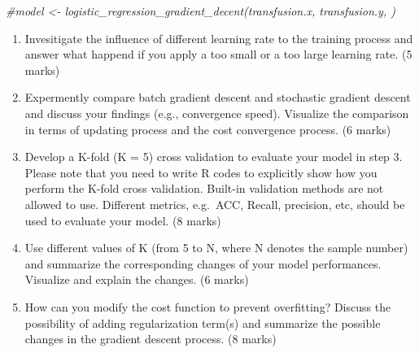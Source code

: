 \documentclass[
]{article}
\newenvironment{Shaded}{\begin{snugshade}}{\end{snugshade}}
\newcommand{\CommentTok}[1]{\textcolor[rgb]{0.56,0.35,0.01}{\textit{#1}}}
\providecommand{\tightlist}{%
  \setlength{\itemsep}{0pt}\setlength{\parskip}{0pt}}
\begin{document}
\begin{Shaded}
\begin{Highlighting}[]
\CommentTok{#model <- logistic_regression_gradient_decent(transfusion.x, transfusion.y, )}
\end{Highlighting}
\end{Shaded}

\begin{enumerate}
\def\labelenumi{\arabic{enumi}.}
\setcounter{enumi}{3}
\tightlist
\item
  Invesitigate the influence of different learning rate to the training
  process and answer what happend if you apply a too small or a too
  large learning rate. (5 marks)
\item
  Expermently compare batch gradient descent and stochastic gradient
  descent and discuss your findings (e.g., convergence speed). Visualize
  the comparison in terms of updating process and the cost convergence
  process. (6 marks)
\item
  Develop a K-fold (K = 5) cross validation to evaluate your model in
  step 3. Please note that you need to write R codes to explicitly show
  how you perform the K-fold cross validation. Built-in validation
  methods are not allowed to use. Different metrics, e.g.~ACC, Recall,
  precision, etc, should be used to evaluate your model. (8 marks)
\item
  Use different values of K (from 5 to N, where N denotes the sample
  number) and summarize the corresponding changes of your model
  performances. Visualize and explain the changes. (6 marks)
\item
  How can you modify the cost function to prevent overfitting? Discuss
  the possibility of adding regularization term(s) and summarize the
  possible changes in the gradient descent process. (8 marks)
\end{enumerate}
\end{document}
